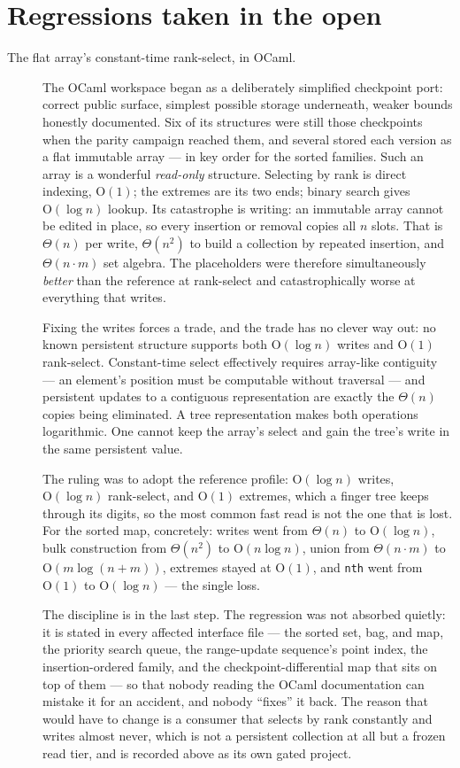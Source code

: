 \documentclass[11pt,twoside,openright]{book}
\newcommand{\code}[1]{\texorpdfstring{\textcolor{d7ink}{\texttt{#1}}}{#1}}
\newcommand{\bigoh}[1]{$\mathrm{O}(#1)$}
\begin{document}
\section{Regressions taken in the open}

\begin{description}
\item[The flat array's constant-time rank-select, in OCaml.] The OCaml workspace
began as a deliberately simplified checkpoint port: correct public surface,
simplest possible storage underneath, weaker bounds honestly documented. Six of
its structures were still those checkpoints when the parity campaign reached
them, and several stored each version as a flat immutable array --- in key order
for the sorted families. Such an
array is a wonderful \emph{read-only} structure. Selecting by rank is direct
indexing, \bigoh{1}; the extremes are its two ends; binary search gives
\bigoh{\log n} lookup. Its catastrophe is writing: an immutable array cannot be
edited in place, so every insertion or removal copies all $n$ slots. That is
$\Theta(n)$ per write, $\Theta(n^2)$ to build a collection by repeated
insertion, and $\Theta(n \cdot m)$ set algebra. The placeholders were therefore
simultaneously \emph{better} than the reference at rank-select and
catastrophically worse at everything that writes.

Fixing the writes forces a trade, and the trade has no clever way out: no known
persistent structure supports both \bigoh{\log n} writes and \bigoh{1}
rank-select. Constant-time select effectively requires array-like contiguity ---
an element's position must be computable without traversal --- and persistent
updates to a contiguous representation are exactly the $\Theta(n)$ copies being
eliminated. A tree representation makes both operations logarithmic. One cannot
keep the array's select and gain the tree's write in the same persistent value.

The ruling was to adopt the reference profile: \bigoh{\log n} writes,
\bigoh{\log n} rank-select, and \bigoh{1} extremes, which a finger tree keeps
through its digits, so the most common fast read is not the one that is lost.
For the sorted map, concretely: writes went from $\Theta(n)$ to \bigoh{\log n},
bulk construction from $\Theta(n^2)$ to \bigoh{n \log n}, union from
$\Theta(n \cdot m)$ to \bigoh{m \log(n+m)}, extremes stayed at \bigoh{1}, and
\code{nth} went from \bigoh{1} to \bigoh{\log n} --- the single loss.

The discipline is in the last step. The regression was not absorbed quietly: it
is stated in every affected interface file --- the sorted set, bag, and map, the
priority search queue, the range-update sequence's point index, the
insertion-ordered family, and the checkpoint-differential map that sits on top
of them --- so that nobody reading the OCaml documentation can mistake it for an
accident, and nobody ``fixes'' it back. The reason that would have to
change is a consumer that selects by rank constantly and writes almost never,
which is not a persistent collection at all but a frozen read tier, and is
recorded above as its own gated project.
\end{description}
\end{document}
